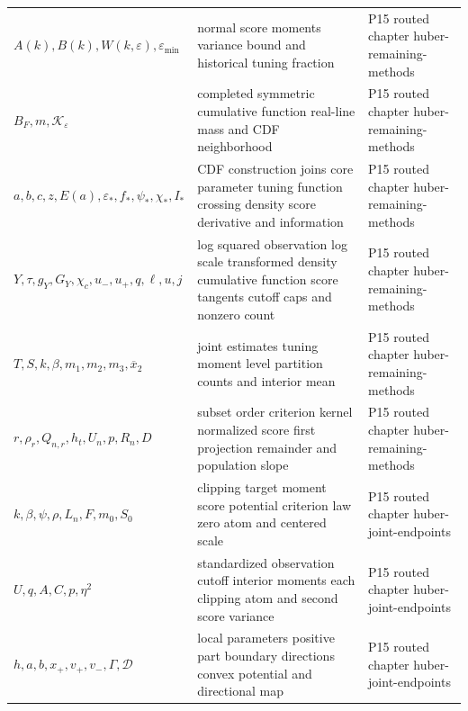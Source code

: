 \begin{longtable}{@{}p{}p{}p{}@{}}
\(A(k),\allowbreak B(k),\allowbreak W(k,\allowbreak \varepsilon),\allowbreak \varepsilon_{\min}\) & normal score moments variance bound and historical tuning fraction & P15 routed chapter huber-\allowbreak{}remaining-\allowbreak{}methods \\
\(B_F,\allowbreak m,\allowbreak \mathcal K_\varepsilon\) & completed symmetric cumulative function real-line mass and CDF neighborhood & P15 routed chapter huber-\allowbreak{}remaining-\allowbreak{}methods \\
\(a,\allowbreak b,\allowbreak c,\allowbreak z,\allowbreak E(a),\allowbreak \varepsilon_*,\allowbreak f_*,\allowbreak \psi_*,\allowbreak \chi_*,\allowbreak I_*\) & CDF construction joins core parameter tuning function crossing density score derivative and information & P15 routed chapter huber-\allowbreak{}remaining-\allowbreak{}methods \\
\(Y,\allowbreak \tau,\allowbreak g_Y,\allowbreak G_Y,\allowbreak \chi_c,\allowbreak u_-,\allowbreak u_+,\allowbreak q,\allowbreak \ell,\allowbreak u,\allowbreak j\) & log squared observation log scale transformed density cumulative function score tangents cutoff caps and nonzero count & P15 routed chapter huber-\allowbreak{}remaining-\allowbreak{}methods \\
\(T,\allowbreak S,\allowbreak k,\allowbreak \beta,\allowbreak m_1,\allowbreak m_2,\allowbreak m_3,\allowbreak \overline x_2\) & joint estimates tuning moment level partition counts and interior mean & P15 routed chapter huber-\allowbreak{}remaining-\allowbreak{}methods \\
\(r,\allowbreak \rho_r,\allowbreak Q_{n,r},\allowbreak h_t,\allowbreak U_n,\allowbreak p,\allowbreak R_n,\allowbreak D\) & subset order criterion kernel normalized score first projection remainder and population slope & P15 routed chapter huber-\allowbreak{}remaining-\allowbreak{}methods \\
\(k,\allowbreak \beta,\allowbreak \psi,\allowbreak \rho,\allowbreak L_n,\allowbreak F,\allowbreak m_0,\allowbreak S_0\) & clipping target moment score potential criterion law zero atom and centered scale & P15 routed chapter huber-\allowbreak{}joint-\allowbreak{}endpoints \\
\(U,\allowbreak q,\allowbreak A,\allowbreak C,\allowbreak p,\allowbreak \eta^2\) & standardized observation cutoff interior moments each clipping atom and second score variance & P15 routed chapter huber-\allowbreak{}joint-\allowbreak{}endpoints \\
\(h,\allowbreak a,\allowbreak b,\allowbreak x_+,\allowbreak v_+,\allowbreak v_-,\allowbreak \Gamma,\allowbreak \mathcal D\) & local parameters positive part boundary directions convex potential and directional map & P15 routed chapter huber-\allowbreak{}joint-\allowbreak{}endpoints \\

\end{longtable}
